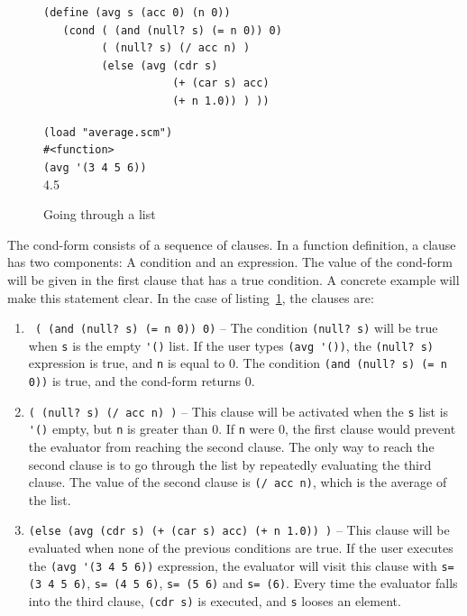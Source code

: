 \documentclass[a4paper,12pt]{book}
\newenvironment{fmpage}[1]
               {\begin{lrbox}{\fmbox}\begin{minipage}{#1}}
               {\end{minipage}\end{lrbox}\fbox{\usebox{\fmbox}}}
\begin{document}
\begin{figure}[!h]
\begin{fmpage}{0.9\textwidth}
\begin{verbatim}
(define (avg s (acc 0) (n 0))
   (cond ( (and (null? s) (= n 0)) 0)
         ( (null? s) (/ acc n) )
         (else (avg (cdr s) 
                    (+ (car s) acc) 
                    (+ n 1.0)) ) ))
\end{verbatim}
\end{fmpage}

\begin{fmpage}{0.9\textwidth}
  \verb|(load "average.scm")|\\
  \verb|#<function>|\\
  \verb|(avg '(3 4 5 6))|\\
  4.5
\end{fmpage}
\caption{Going through a list}
\label{going-through-a-list}
\end{figure}

The cond-form consists of a sequence
of clauses. In a function definition,
a clause has two components: A condition
and an expression. The value of the
cond-form will be given in the first
clause that has a true condition.
A concrete example will make this
statement clear. In the case of
listing~\ref{going-through-a-list},
the clauses are:
\begin{enumerate}
\item \verb| ( (and (null? s) (= n 0)) 0)| --
  The condition \verb|(null? s)| will be true
  when \verb|s| is the empty \verb|'()| list.
  If the user types \verb|(avg '())|,
  the \verb|(null? s)| expression is true, and \verb|n| is
  equal to 0. The condition
   \verb|(and (null? s) (= n 0))| is true, and the cond-form
  returns 0.
\item \verb|( (null? s) (/ acc n) )| -- This clause
  will be activated when the \verb|s| list is
  \verb|'()| empty, but \verb|n| is greater than
  0. If \verb|n| were 0, the first clause
  would prevent the evaluator from
  reaching the second clause. The only
  way to reach the second clause is to go through
  the list by repeatedly evaluating the third clause.
  The value of the second clause is \verb|(/ acc n)|,
  which is the average of the list.
\item \verb|(else (avg (cdr s) (+ (car s) acc) (+ n 1.0)) )| --
  This clause will be evaluated
  when none of the previous conditions are true.
  If the user executes the \verb|(avg '(3 4 5 6))|
  expression, the evaluator will visit this
  clause with \verb|s= (3 4 5 6)|, \verb|s= (4 5 6)|,
  \verb|s= (5 6)| and \verb|s= (6)|.
  Every time the evaluator falls into the third
  clause, \verb|(cdr s)| is executed, and \verb|s|
  looses an element.
\end{enumerate}
\end{document}
